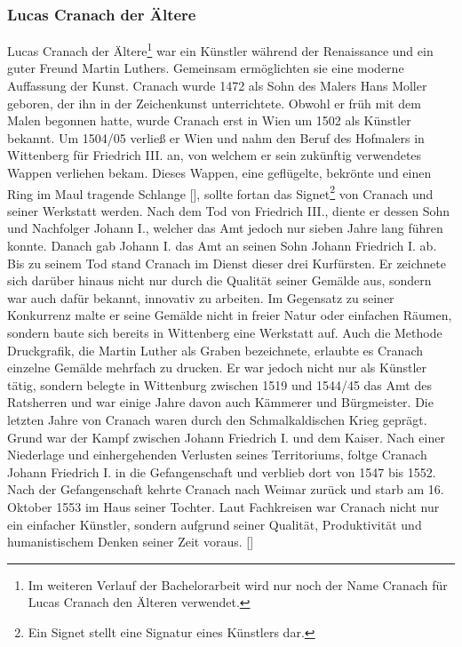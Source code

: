 \documentclass[a4paper,12pt,oneside]{article}
\begin{document}
    \subsubsection{Lucas Cranach der Ältere}
      Lucas Cranach der Ältere\footnote{Im weiteren Verlauf der Bachelorarbeit wird nur noch der Name Cranach für Lucas Cranach den Älteren verwendet.} 
      war ein Künstler während der Renaissance und
      ein guter Freund Martin Luthers. Gemeinsam ermöglichten sie eine moderne 
      Auffassung der Kunst.
      Cranach wurde 1472 als Sohn des Malers Hans Moller geboren,
      der ihn in der Zeichenkunst unterrichtete.
      Obwohl er früh mit dem Malen begonnen hatte, wurde Cranach erst in Wien
      um 1502 als Künstler bekannt. Um 1504/05
      verließ er Wien und nahm den Beruf des Hofmalers in Wittenberg für Friedrich III. 
      an, von welchem er sein zukünftig verwendetes Wappen verliehen bekam.
      Dieses Wappen, eine \glqq geflügelte, bekrönte und einen Ring im Maul tragende
      Schlange\grqq{} [\cite[15]{heydenreich2017lucas}], sollte fortan das Signet\footnote{Ein Signet stellt eine Signatur eines Künstlers dar.} 
      von Cranach und seiner Werkstatt werden.
      Nach dem Tod von Friedrich III., diente er dessen Sohn und Nachfolger
      Johann I., welcher das Amt jedoch nur sieben Jahre lang führen konnte.
      Danach gab Johann I. das Amt an seinen Sohn Johann Friedrich I. ab.
      Bis zu seinem Tod stand Cranach im Dienst dieser drei Kurfürsten.
      Er zeichnete sich darüber hinaus nicht nur durch die Qualität seiner Gemälde aus,
      sondern war auch dafür bekannt, innovativ zu arbeiten.
      Im Gegensatz zu seiner Konkurrenz malte er seine Gemälde nicht in freier
      Natur oder einfachen Räumen, sondern baute sich bereits in Wittenberg eine Werkstatt auf.
      Auch die Methode \glqq Druckgrafik\grqq{}, die Martin Luther 
      als \glqq Graben\grqq{} bezeichnete, erlaubte es
      Cranach einzelne Gemälde mehrfach zu drucken.
      Er war jedoch nicht nur als Künstler tätig, sondern belegte in Wittenburg
      zwischen 1519 und 1544/45 das Amt des Ratsherren und war einige Jahre davon auch
      Kämmerer und Bürgmeister.
      Die letzten Jahre von Cranach waren durch den Schmalkaldischen Krieg
      geprägt. Grund war der Kampf zwischen Johann Friedrich I. und dem Kaiser. 
      Nach einer Niederlage und einhergehenden
      Verlusten seines Territoriums, foltge Cranach Johann Friedrich I.
      in die Gefangenschaft und verblieb dort von 1547 bis 1552.
      Nach der Gefangenschaft kehrte Cranach nach Weimar zurück und starb
      am 16. Oktober 1553 im Haus seiner Tochter.
      Laut Fachkreisen war Cranach nicht nur ein einfacher Künstler, sondern
      aufgrund seiner Qualität, Produktivität und humanistischem Denken
      seiner Zeit voraus. [\cite{heydenreich2017lucas}]
\end{document}
